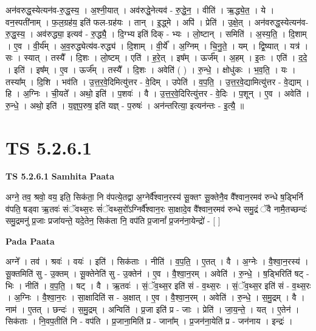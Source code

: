 \documentclass[17pt]{extarticle}
\begin{document}
अन॑वरुद्ध॒स्येत्यन॑व-रु॒द्ध॒स्य॒ । अ॒श्नी॒यात् । अव॑रुद्धे॒नेत्यव॑ - रु॒द्धे॒न॒ । वीति॑ । ऋ॒द्ध्ये॒त॒ । ये । वन॒स्पती॑नाम् । फ॒ल॒ग्रह॑य॒ इति॑ फल-ग्रह॑यः । तान् । इ॒द्ध्मे । अपि॑ । प्रेति॑ । उ॒क्षे॒त् । अन॑वरुद्ध॒स्येत्यन॑व-रु॒द्ध॒स्य॒ । अव॑रुद्ध्या॒ इत्यव॑ - रु॒द्ध्यै॒ । दि॒ग्भ्य इति॑ दिक् - भ्यः । लो॒ष्टान् । समिति॑ । अ॒स्य॒ति॒ । दि॒शाम् । ए॒व । वी॒र्य᳚म् । अ॒व॒रुद्ध्येत्य॑व-रुद्ध्य॑ । दि॒शाम् । वी॒र्ये᳚ । अ॒ग्निम् । चि॒नु॒ते॒ । यम् । द्वि॒ष्यात् । यत्र॑ । सः । स्यात् । तस्यै᳚ । दि॒शः । लो॒ष्टम् । एति॑ । ह॒रे॒त् । इष᳚म् । ऊर्ज᳚म् । अ॒हम् । इ॒तः । एति॑ । द॒दे॒ । इति॑ । इष᳚म् । ए॒व । ऊर्ज᳚म् । तस्यै᳚ । दि॒शः । अवेति॑ ( ) । रु॒न्धे॒ । क्षोधु॑कः । भ॒व॒ति॒ । यः । तस्या᳚म् । दि॒शि । भव॑ति । उ॒त्त॒र॒वे॒दिमित्यु॑त्तर - वे॒दिम् । उपेति॑ । व॒प॒ति॒ । उ॒त्त॒र॒वे॒द्यामित्यु॑त्तर - वे॒द्याम् । हि । अ॒ग्निः । ची॒यते᳚ । अथो॒ इति॑ । प॒शवः॑ । वै । उ॒त्त॒र॒वे॒दिरित्यु॑त्तर - वे॒दिः । प॒शून् । ए॒व । अवेति॑ । रु॒न्धे॒ । अथो॒ इति॑ । य॒ज्ञ्॒प॒रुष॒ इति॑ यज्ञ् - प॒रुषः॑ । अन॑न्तरित्या॒ इत्यन॑न्तः - इ॒त्यै॒ ॥  \newline




\section*{ TS 5.2.6.1 }

\textbf{TS 5.2.6.1 } \newline
\textbf{Samhita Paata} \newline

अग्ने॒ तव॒ श्रवो॒ वय॒ इति॒ सिक॑ता॒ नि व॑पत्ये॒तद्वा अ॒ग्नेर्वै᳚श्वान॒रस्य॑ सू॒क्तꣳ सू॒क्तेनै॒व वै᳚श्वान॒रमव॑ रुन्धे ष॒ड्भिर्नि व॑पति॒ षड्वा ऋ॒तवः॑ संॅवथ्स॒रः सं॑ॅवथ्स॒रो᳚ऽग्निर्वै᳚श्वान॒रः सा॒क्षादे॒व वै᳚श्वान॒रमव॑ रुन्धे समु॒द्रं ॅवै नामै॒तच्छन्दः॑ समु॒द्रमनु॑ प्र॒जाः प्रजा॑यन्ते॒ यदे॒तेन॒ सिक॑ता नि॒ वप॑ति प्र॒जानां᳚ प्र॒जन॑ना॒येन्द्रो॑ - [  ] \newline

\textbf{Pada Paata} \newline

अग्ने᳚ । तव॑ । श्रवः॑ । वयः॑ । इति॑ । सिक॑ताः । नीति॑ । व॒प॒ति॒ । ए॒तत् । वै । अ॒ग्नेः । वै॒श्वा॒न॒रस्य॑ । सू॒क्तमिति॑ सु - उ॒क्तम् । सू॒क्तेनेति॑ सु - उ॒क्तेन॑ । ए॒व । वै॒श्वा॒न॒रम् । अवेति॑ । रु॒न्धे॒ । ष॒ड्भिरिति॑ षट् - भिः । नीति॑ । व॒प॒ति॒ । षट् । वै । ऋ॒तवः॑ । सं॒ॅव॒थ्स॒र इति॑ सं - व॒थ्स॒रः । सं॒ॅव॒थ्स॒र इति॑ सं - व॒थ्स॒रः । अ॒ग्निः । वै॒श्वा॒न॒रः । सा॒क्षादिति॑ स - अ॒क्षात् । ए॒व । वै॒श्वा॒न॒रम् । अवेति॑ । रु॒न्धे॒ । स॒मु॒द्रम् । वै । नाम॑ । ए॒तत् । छन्दः॑ । स॒मु॒द्रम् । अन्विति॑ । प्र॒जा इति॑ प्र - जाः । प्रेति॑ । जा॒य॒न्ते॒ । यत् । ए॒तेन॑ । सिक॑ताः । नि॒वप॒तीति॑ नि - वप॑ति । प्र॒जाना॒मिति॑ प्र - जाना᳚म् । प्र॒जन॑ना॒येति॑ प्र - जन॑नाय । इन्द्रः॑ ।  \newline
\end{document}
